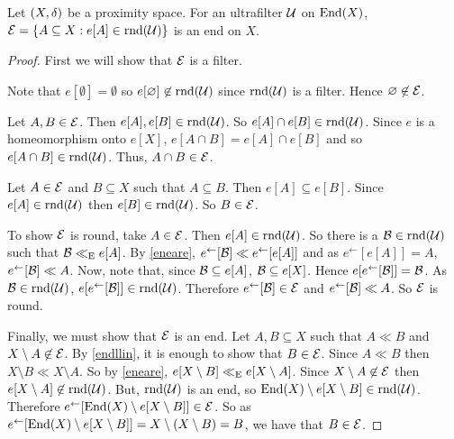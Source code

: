 \begin{lemma}
	\label{Eend}
	Let \( (X,\mathord{\delta}) \) be a proximity space.  For an ultrafilter \( \mathcal{U} \) on \( \operatorname{End}(X) \), \( \mathcal{E} = \{ A \subseteq X : e[A] \in \operatorname{rnd}(\mathcal{U}) \} \) is an end on \( X \).
\end{lemma}
\begin{proof}
	First we will show that \( \mathcal{E} \) is a filter.
	
	Note that \( e[\emptyset] = \emptyset \) so \( e[\varnothing] \not\in \operatorname{rnd}(\mathcal{U}) \) since \( \operatorname{rnd}(\mathcal{U}) \) is a filter.  Hence \( \varnothing \not\in \mathcal{E} \).
	
	Let \( A,B \in \mathcal{E} \).  Then \( e[A],e[B] \in \operatorname{rnd}(\mathcal{U}) \).  So \( e[A] \cap e[B] \in \operatorname{rnd}(\mathcal{U}) \).  Since \( e \) is a homeomorphism onto \( e[X] \), \( e[A \cap B] = e[A] \cap e[B] \) and so \( e[A \cap B] \in \operatorname{rnd}(\mathcal{U}) \).  Thus, \( A \cap B \in \mathcal{E} \).
	
	Let \( A \in \mathcal{E} \) and \( B \subseteq X \) such that \( A \subseteq B \).  Then \( e[A] \subseteq e[B] \).  Since \( e[A] \in \operatorname{rnd}(\mathcal{U}) \) then \( e[B] \in \operatorname{rnd}(\mathcal{U}) \).  So \( B \in \mathcal{E} \).
	
	To show \( \mathcal{E} \) is round, take \( A \in \mathcal{E} \).  Then \( e[A] \in \operatorname{rnd}(\mathcal{U}) \).  So there is a \( \mathcal{B} \in \operatorname{rnd}(\mathcal{U}) \) such that \( \mathcal{B} \mathrel{\ll_\text{E}} e[A] \).  By \ref{eneare}, \( e^\leftarrow[\mathcal{B}] \ll e^\leftarrow[e[A]] \) and as \( e^\leftarrow[e[A]] = A \), \( e^\leftarrow[\mathcal{B}] \ll A \).  Now, note that, since \( \mathcal{B} \subseteq e[A] \), \( \mathcal{B} \subseteq e[X] \).  Hence \( e[e^\leftarrow[\mathcal{B}]] = \mathcal{B} \).  As \( \mathcal{B} \in \operatorname{rnd}(\mathcal{U}) \), \( e[e^\leftarrow[\mathcal{B}]] \in \operatorname{rnd}(\mathcal{U}) \).  Therefore \( e^\leftarrow[\mathcal{B}] \in \mathcal{E} \) and \( e^\leftarrow[\mathcal{B}] \ll A \).  So \( \mathcal{E} \) is round.
	
	Finally, we must show that \( \mathcal{E} \) is an end.  Let \( A,B \subseteq X \) such that \( A \ll B \) and \( X \setminus A \not\in \mathcal{E} \).  By \ref{endllin}, it is enough to show that \( B \in \mathcal{E} \).  Since \( A \ll B \) then \( X \setminus B \ll X \setminus A \).  So by \ref{eneare}, \( e[X \setminus B] \mathrel{\ll_\text{E}} e[X \setminus A] \).  Since \( X \setminus A \not\in \mathcal{E} \) then \( e[X \setminus A] \not\in \operatorname{rnd}(\mathcal{U}) \).  But, \( \operatorname{rnd}(\mathcal{U}) \) is an end, so \( \operatorname{End}(X) \setminus e[X \setminus B] \in \operatorname{rnd}(\mathcal{U}) \).  Therefore \( e^\leftarrow[\operatorname{End}(X) \setminus e[X \setminus B]] \in \mathcal{E} \).  So as \( e^\leftarrow[\operatorname{End}(X) \setminus e[X \setminus B]] = X \setminus (X \setminus B) = B \), we have that \( B \in \mathcal{E} \).
\end{proof}

